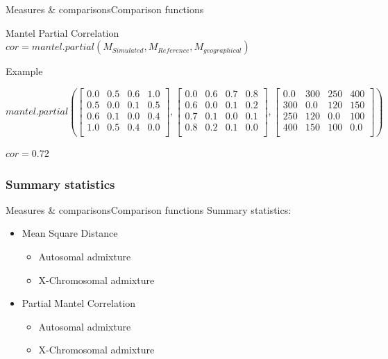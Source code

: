 \documentclass[10pt,aspectratio=43]{beamer}
\begin{document}
\addtocounter{framenumber}{-1}
\begin{frame}{Measures \& comparisons}{Comparison functions}
\begin{mblock}{0.7}{Mantel Partial Correlation}
  \centering  
  $cor = mantel.partial(M_{Simulated}, M_{Reference}, M_{geographical})$
\end{mblock}
\begin{mblock}{0.7}{Example}
  \begin{center}
    \fontsize{5pt}{8pt}
    $mantel.partial(\begin{bmatrix}
      0.0 & 0.5 & 0.6 & 1.0 \\
      0.5 & 0.0 & 0.1 & 0.5 \\
      0.6 & 0.1 & 0.0 & 0.4 \\
      1.0 & 0.5 & 0.4 & 0.0 \\
    \end{bmatrix}, \begin{bmatrix}
      0.0 & 0.6 & 0.7 & 0.8 \\
      0.6 & 0.0 & 0.1 & 0.2 \\
      0.7 & 0.1 & 0.0 & 0.1 \\
      0.8 & 0.2 & 0.1 & 0.0 \\
    \end{bmatrix}, \begin{bmatrix}
      0.0 & 300 & 250 & 400 \\
      300 & 0.0 & 120 & 150 \\
      250 & 120 & 0.0 & 100 \\
      400 & 150 & 100 & 0.0 \\
    \end{bmatrix})$
  \end{center}
  \centering
  $cor = 0.72$
\end{mblock}
\end{frame}

\subsubsection{Summary statistics}
\begin{frame}{Measures \& comparisons}{Comparison functions}
Summary statistics:
\begin{itemize}
  \item Mean Square Distance
  \begin{itemize}
    \item Autosomal admixture
    \item X-Chromosomal admixture
  \end{itemize}
  \item Partial Mantel Correlation
  \begin{itemize}
    \item Autosomal admixture
    \item X-Chromosomal admixture
  \end{itemize}
\end{itemize}
\end{frame}
\end{document}
